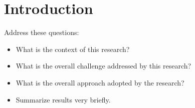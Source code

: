 \section{Introduction}

Address these questions:

\begin{itemize}

\item What is the context of this research?

\item What is the overall challenge addressed by this research?

\item What is the overall approach adopted by the research?

\item Summarize results very briefly.

\end{itemize}

